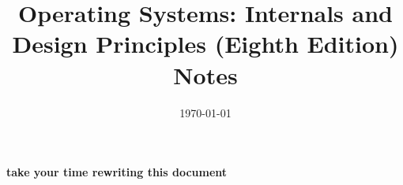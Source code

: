 \documentclass{article}
\title{Operating Systems: Internals and Design Principles (Eighth Edition) Notes}
\date{\today}
\begin{document}
\maketitle

\textbf{take your time rewriting this document}
\end{document}
